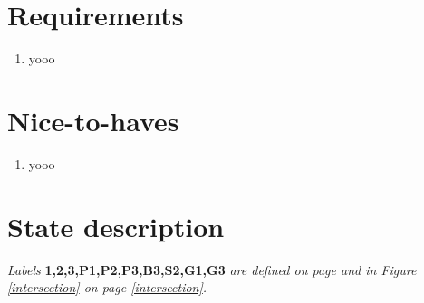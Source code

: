 \documentclass[letterpaper]{article}
\begin{document}
\section{Requirements}
\begin{enumerate}
 \item yooo
\end{enumerate}

\section{Nice-to-haves}
\begin{enumerate}
 \item yooo
\end{enumerate}



\section{State description}
\textit{Labels}
\textbf{1,2,3,P1,P2,P3,B3,S2,G1,G3}
\textit{are defined on page \pageref{Definitions} and in Figure \ref{intersection} on page \ref{intersection}.}
\end{document}
